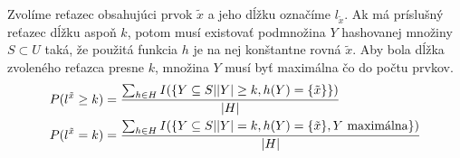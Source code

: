 Zvolíme reťazec obsahujúci prvok $\tilde{x}$ a jeho dĺžku označíme $l_{\tilde{x}}$. Ak má príslušný reťazec dĺžku aspoň $k$, potom musí existovať podmnožina $Y$ hashovanej množiny $S \subset U$ taká, že použitá funkcia $h$ je na nej konštantne rovná $\tilde{x}$. Aby bola dĺžka zvoleného reťazca presne $k$, množina $Y$ musí byť maximálna čo do počtu prvkov.
\begin{displaymath}
\begin{split}
P(l^{\tilde{x}} \geq k) & = \frac{\sum\displaylimits_{h \in H} I(\{ Y \subseteq S | |Y| \geq k, h(Y) = \{ \tilde{x} \} \})}{|H|} \\
P(l^{\tilde{x}} = k) & = \frac{\sum\displaylimits_{h \in H} I(\{ Y \subseteq S | |Y| = k, h(Y) = \{ \tilde{x} \}, Y \text{ maximálna} \})}{|H|} \\
\end{split}
\end{displaymath}

